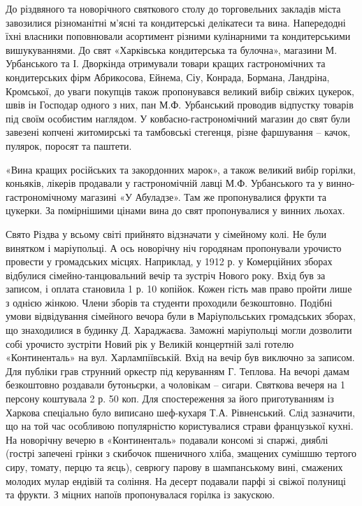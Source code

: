 До різдвяного та новорічного святкового столу до торговельних закладів міста
завозилися різноманітні м'ясні та кондитерські делікатеси та вина. Напередодні
їхні власники поповнювали асортимент різними кулінарними та кондитерськими
вишукуваннями. До свят «Харківська кондитерська та булочна», магазини М.
Урбанського та І. Дворкінда отримували товари кращих гастрономічних та
кондитерських фірм Абрикосова, Ейнема, Сіу, Конрада, Бормана, Ландріна,
Кромської, до уваги покупців також пропонувався великий вибір свіжих цукерок,
швів ін Господар одного з них, пан М.Ф. Урбанський проводив відпустку товарів
під своїм особистим наглядом. У ковбасно-гастрономічний магазин до свят були
завезені копчені житомирські та тамбовські стегенця, різне фаршування – качок,
пулярок, поросят та паштети.


«Вина кращих російських та закордонних марок», а також великий вибір горілки,
коньяків, лікерів продавали у гастрономічній лавці М.Ф. Урбанського та у
винно-гастрономічному магазині «У Абуладзе». Там же пропонувалися фрукти та
цукерки. За помірнішими цінами вина до свят пропонувалися у винних льохах.

Свято Різдва у всьому світі прийнято відзначати у сімейному колі. Не були
винятком і маріупольці. А ось новорічну ніч городянам пропонували урочисто
провести у громадських місцях. Наприклад, у 1912 р. у Комерційних зборах
відбулися сімейно-танцювальний вечір та зустріч Нового року. Вхід був за
записом, і оплата становила 1 р. 10 копійок. Кожен гість мав право пройти лише
з однією жінкою. Члени зборів та студенти проходили безкоштовно. Подібні умови
відвідування сімейного вечора були в Маріупольських громадських зборах, що
знаходилися в будинку Д. Хараджаєва. Заможні маріупольці могли дозволити собі
урочисто зустріти Новий рік у Великій концертній залі готелю «Континенталь» на
вул. Харлампіївській. Вхід на вечір був виключно за записом. Для публіки грав
струнний оркестр під керуванням Г. Теплова. На вечорі дамам безкоштовно
роздавали бутоньєрки, а чоловікам – сигари. Святкова вечеря на 1 персону
коштувала 2 р. 50 коп. Для спостереження за його приготуванням із Харкова
спеціально було виписано шеф-кухаря Т.А. Рівненський. Слід зазначити, що на той
час особливою популярністю користувалися страви французької кухні. На новорічну
вечерю в «Континенталь» подавали консомі зі спаржі, дияблі (гострі запечені
грінки з скибочок пшеничного хліба, змащених сумішшю тертого сиру, томату,
перцю та яєць), севрюгу парову в шампанському вині, смажених молодих мулар
ендівій та соління. На десерт подавали парфі зі свіжої полуниці та фрукти. З
міцних напоїв пропонувалася горілка із закускою.

